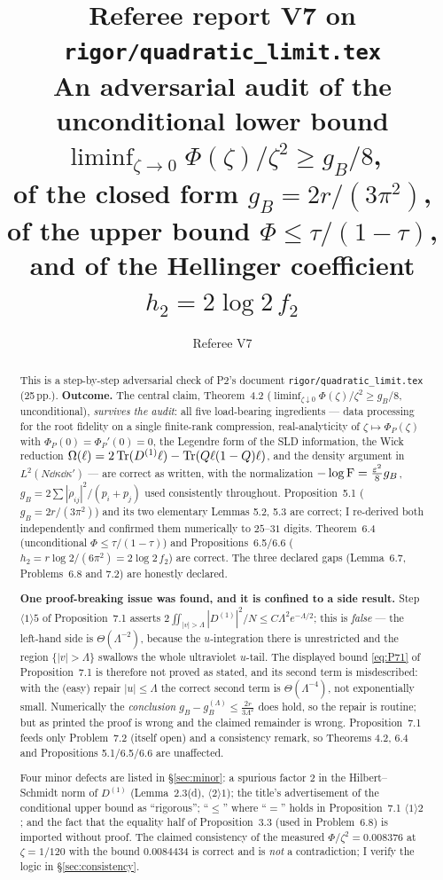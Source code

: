 \documentclass[11pt]{article}
\title{Referee report V7 on \texttt{rigor/quadratic\_limit.tex}\\[3pt]
\large An adversarial audit of the unconditional lower bound
\(\liminf_{\zeta\to0}\Phi(\zeta)/\zeta^{2}\ge g_B/8\),\\
of the closed form \(g_B=2r/(3\pi^2)\), of the upper bound \(\Phi\le\tau/(1-\tau)\),\\
and of the Hellinger coefficient \(h_2=2\log2\,f_2\)}
\author{Referee V7}\date{}
\theoremstyle{definition}\newtheorem{problem}[theorem]{Problem}
\begin{document}
\maketitle

\begin{abstract}\noindent
This is a step-by-step adversarial check of P2's document \texttt{rigor/quadratic\_limit.tex}
(25\,pp.).  \textbf{Outcome.}  The central claim, Theorem~4.2
(\(\liminf_{\zeta\downarrow0}\Phi(\zeta)/\zeta^2\ge g_B/8\), unconditional), \emph{survives the
audit}: all five load-bearing ingredients --- data processing for the root fidelity on a single
finite-rank compression, real-analyticity of \(\zeta\mapsto\Phi_P(\zeta)\) with
\(\Phi_P(0)=\Phi_P'(0)=0\), the Legendre form of the SLD information, the Wick reduction
\(\Omega(\ell)=2\operatorname{Tr}(D^{(1)}\ell)-\operatorname{Tr}(Q\ell(1-Q)\ell)\), and the density argument in
\(L^2(N\dd\kappa\dd\kappa')\) --- are correct as written, with the normalization
\(-\log\operatorname{F}=\frac{\varepsilon^2}8 g_B\), \(g_B=2\sum|\dot\rho_{ij}|^2/(p_i+p_j)\) used consistently
throughout.  Proposition~5.1 (\(g_B=2r/(3\pi^2)\)) and its two elementary Lemmas 5.2, 5.3 are
correct; I re-derived both independently and confirmed them numerically to \(25\)--\(31\) digits.
Theorem~6.4 (unconditional \(\Phi\le\tau/(1-\tau)\)) and Propositions~6.5/6.6
(\(h_2=r\log2/(6\pi^2)=2\log2\,f_2\)) are correct.  The three declared gaps (Lemma~6.7,
Problems~6.8 and 7.2) are honestly declared.

\medskip\noindent
\textbf{One proof-breaking issue was found, and it is confined to a side result.}  Step
\(\langle1\rangle5\) of Proposition~7.1 asserts
\(2\iint_{|v|>\Lambda}|D^{(1)}|^2/N\le C\Lambda^2e^{-\Lambda/2}\); this is \emph{false} --- the
left-hand side is \(\Theta(\Lambda^{-2})\), because the \(u\)-integration there is unrestricted and
the region \(\{|v|>\Lambda\}\) swallows the whole ultraviolet \(u\)-tail.  The displayed bound
\eqref{eq:P71} of Proposition~7.1 is therefore not proved as stated, and its second term is
misdescribed: with the (easy) repair \(|u|\le\Lambda\) the correct second term is
\(\Theta(\Lambda^{-4})\), not exponentially small.  Numerically the \emph{conclusion}
\(g_B-g_B^{(\Lambda)}\le\frac{2r}{3\Lambda^2}\) does hold, so the repair is routine; but as printed
the proof is wrong and the claimed remainder is wrong.  Proposition~7.1 feeds only
Problem~7.2 (itself open) and a consistency remark, so Theorems 4.2, 6.4 and Propositions
5.1/6.5/6.6 are unaffected.

\medskip\noindent
Four minor defects are listed in \S\ref{sec:minor}: a spurious factor \(2\) in the
Hilbert--Schmidt norm of \(D^{(1)}\) (Lemma~2.3(d), \(\langle2\rangle1\)); the title's advertisement
of the conditional upper bound as ``rigorous''; ``\(\le\)'' where ``\(=\)'' holds in
Proposition~7.1 \(\langle1\rangle2\); and the fact that the equality half of Proposition~3.3 (used
in Problem~6.8) is imported without proof.  The claimed consistency of the measured
\(\Phi/\zeta^2=0.008376\) at \(\zeta=1/120\) with the bound \(0.0084434\) is correct and is
\emph{not} a contradiction; I verify the logic in \S\ref{sec:consistency}.
\end{abstract}
\end{document}

